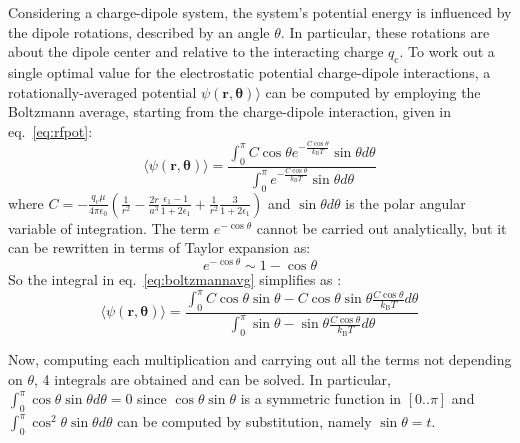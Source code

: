 \documentclass[11pt,oneside,a4paper]{article}
\begin{document}
Considering a charge-dipole system, the system's potential energy is influenced by the dipole rotations, described by an angle $\theta$. In particular, these rotations are about the dipole center and relative to the interacting charge $q_\mathrm{c}$.
To work out a single optimal value for the electrostatic potential charge-dipole interactions, a rotationally-averaged potential $\psi(\mathbf{r},\mathbf{\theta}) \rangle$  can be computed by employing the Boltzmann average, starting from the charge-dipole interaction, given in eq.~\ref{eq:rfpot}:
\begin{equation}
 \label{eq:boltzmannavg}
 \langle \psi(\mathbf{r},\mathbf{\theta}) \rangle = \frac{\int_{0}^{\pi} C \cos\theta e^{-\frac{C\cos\theta}{k_\mathrm{B}T}} \sin\theta d\theta } {\int_{0}^{\pi}e^{-\frac{C\cos\theta}{k_\mathrm{B}T}} \sin\theta d\theta} 
\end{equation}
where $C= -\frac{q_\mathrm{c}\mu}{4\pi\epsilon_0}\left ( \frac{1}{r^2} -\frac{2r}{a^3}\frac{\epsilon_1 -1}{1 + 2\epsilon_1} + \frac{1}{r^2}\frac{3}{1 + 2\epsilon_1} \right ) $ and $\sin\theta d\theta$ is the polar angular variable of integration.
The term $e^{-\cos\theta}$ cannot be carried out analytically, but it can be rewritten in terms of Taylor expansion as:
\begin{equation}
 \label{eq:taylorexp}
 e^{-\cos\theta} \sim 1 - \cos\theta
\end{equation}
So the integral in eq.~\ref{eq:boltzmannavg} simplifies as :
\begin{equation}
 \label{eq:simplification}
\langle \psi(\mathbf{r},\mathbf{\theta}) \rangle = \frac{\int_{0}^{\pi} C\cos\theta\sin\theta - C\cos\theta\sin\theta\frac{C\cos\theta}{k_\mathrm{B}T} d\theta}
{\int_{0}^{\pi} \sin\theta -\sin\theta\frac{C\cos\theta}{k_\mathrm{B}T} d\theta}
\end{equation}

Now, computing each multiplication and carrying out all the terms not depending on $\theta$, 4 integrals are obtained and can be solved. In particular, $\int_{0}^{\pi}\cos\theta\sin\theta d\theta=0$ since $\cos\theta\sin\theta$ is a symmetric function in $[0..\pi]$ and $\int_{0}^{\pi}\cos^2\theta\sin\theta d\theta$ can be computed by substitution, namely $\sin\theta=t$.
\end{document}
